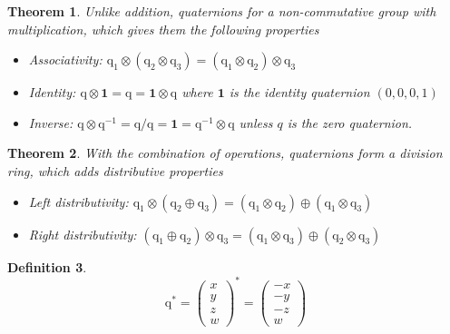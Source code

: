\documentclass{amsart}
\newtheorem{theorem}{Theorem}[section]
\theoremstyle{definition}
\newtheorem{definition}[theorem]{Definition}
\theoremstyle{remark}
\numberwithin{equation}{section}
\begin{document}
\begin{theorem}
  Unlike addition, quaternions for a \emph{non-commutative} group with multiplication, which gives them the following properties
  \begin{itemize}
  \item Associativity: $\mathrm{q}_1\otimes(\mathrm{q}_2\otimes \mathrm{q}_3) = (\mathrm{q}_1\otimes \mathrm{q}_2) \otimes \mathrm{q}_3$
  \item Identity: $\mathrm{q}\otimes\mathbf{1}=\mathrm{q}=\mathbf{1}\otimes \mathrm{q}$ where $\mathbf{1}$ is the identity quaternion $(0, 0, 0, 1)$
  \item Inverse: $\mathrm{q}\otimes \mathrm{q}^{-1}=\mathrm{q}/\mathrm{q}=\mathbf{1}=\mathrm{q}^{-1}\otimes \mathrm{q}$ unless $q$ is the zero quaternion.
  \end{itemize}
\end{theorem}

\begin{theorem}
  With the combination of operations, quaternions form a division ring, which adds distributive properties
  \begin{itemize}
  \item Left distributivity: $\mathrm{q}_1 \otimes \left(\mathrm{q}_2\oplus \mathrm{q}_3\right) = \left(\mathrm{q}_1\otimes \mathrm{q}_2\right) \oplus \left(\mathrm{q}_1\otimes \mathrm{q}_3\right)$
    \item Right distributivity: $\left(\mathrm{q}_1 \oplus \mathrm{q}_2\right) \otimes \mathrm{q}_3 = \left(\mathrm{q}_1\otimes \mathrm{q}_3\right) \oplus \left(\mathrm{q}_2 \otimes \mathrm{q}_3\right)$
  \end{itemize}
\end{theorem}

\begin{definition}
	\begin{equation}
		\mathrm{q}^* = 
		\begin{pmatrix}
			x \\
			y \\
			z \\
			w
		\end{pmatrix}^* =
		\begin{pmatrix}
			-x \\
			-y \\
			-z \\
			w
		\end{pmatrix}
	\end{equation}
\end{definition}
\end{document}
